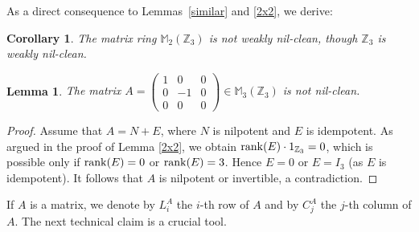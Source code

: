 \documentclass[12]{amsart}
\newtheorem{cor}[thm]{Corollary}
\newtheorem{lem}[thm]{Lemma}
\theoremstyle{definition}
\numberwithin{equation}{section}
\begin{document}
As a direct consequence to Lemmas~\ref{similar} and \ref{2x2}, we derive:

\begin{cor}
The matrix ring ${\mathbb M}_2(\mathbb Z_3)$ is not weakly nil-clean, though $\mathbb Z_3$ is weakly nil-clean.
\end{cor}

\begin{lem}\label{3x3}
The matrix $A=\begin{pmatrix}
               1 & 0 & 0 \\
               0 & -1 & 0 \\
               0 & 0 & 0
              \end{pmatrix}\in\mathbb{M}_3({{\mathbb Z}}_3)$
is not nil-clean.
\end{lem}

\begin{proof}
Assume that $A=N+E$, where $N$ is nilpotent and $E$ is idempotent. As argued in the proof of Lemma \ref{2x2}, we obtain ${\rm rank}(E)\cdot 1_{\mathbb Z_3}=0$, which is possible only if ${\rm rank}(E)=0$ or ${\rm rank}(E)=3$. Hence $E=0$ or $E=I_3$ (as $E$ is idempotent). It follows that $A$ is nilpotent or invertible, a contradiction.
\end{proof}

If $A$ is a matrix, we denote by $L_i^A$ the $i$-th row of $A$ and by $C_j^A$ the $j$-th column of $A$. The next technical claim is a crucial tool.
\end{document}
